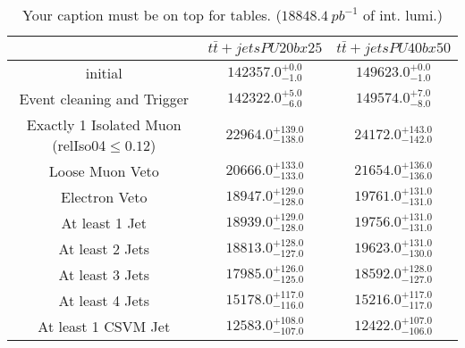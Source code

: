 \documentclass{article}
\begin{document}
\begin{table}
\caption{Your caption must be on top for tables. ($18848.4~pb^{-1}$ of int. lumi.)}
\label{tab:}
\centering
\begin{tabular}{|c|cc|}
\toprule
&$t\bar{t}+jets PU20bx25$	&$t\bar{t}+jets PU40bx50$	\\

\midrule
initial&	$142357.0^{+0.0}_{-1.0}$	&$149623.0^{+0.0}_{-1.0}$	\\

Event cleaning and Trigger&	$142322.0^{+5.0}_{-6.0}$	&$149574.0^{+7.0}_{-8.0}$	\\

Exactly 1 Isolated Muon (relIso04$\leq 0.12$)&	$22964.0^{+139.0}_{-138.0}$	&$24172.0^{+143.0}_{-142.0}$	\\

Loose Muon Veto&	$20666.0^{+133.0}_{-133.0}$	&$21654.0^{+136.0}_{-136.0}$	\\

Electron Veto&	$18947.0^{+129.0}_{-128.0}$	&$19761.0^{+131.0}_{-131.0}$	\\

At least 1 Jet&	$18939.0^{+129.0}_{-128.0}$	&$19756.0^{+131.0}_{-131.0}$	\\

At least 2 Jets&	$18813.0^{+128.0}_{-127.0}$	&$19623.0^{+131.0}_{-130.0}$	\\

At least 3 Jets&	$17985.0^{+126.0}_{-125.0}$	&$18592.0^{+128.0}_{-127.0}$	\\

At least 4 Jets&	$15178.0^{+117.0}_{-116.0}$	&$15216.0^{+117.0}_{-117.0}$	\\

At least 1 CSVM Jet&	$12583.0^{+108.0}_{-107.0}$	&$12422.0^{+107.0}_{-106.0}$	\\

\bottomrule
\end{tabular}
\end{table}
\end{document}
